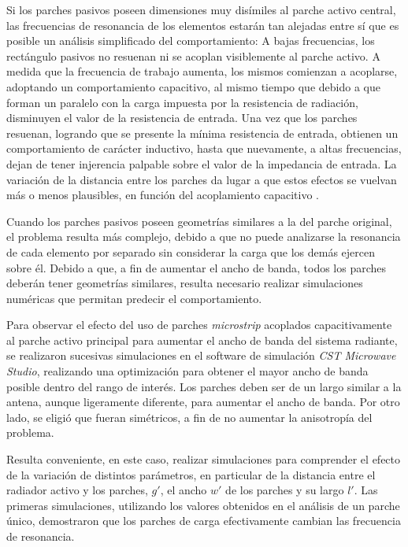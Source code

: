 Si los parches pasivos poseen dimensiones muy disímiles al parche activo central, las frecuencias de resonancia de los elementos estarán tan alejadas entre sí que es posible un análisis simplificado del comportamiento: A bajas frecuencias, los rectángulo pasivos no resuenan ni se acoplan visiblemente al parche activo. A medida que la frecuencia de trabajo aumenta, los mismos comienzan a acoplarse, adoptando un comportamiento capacitivo, al mismo tiempo que debido a que forman un paralelo con la carga impuesta por la resistencia de radiación, disminuyen el valor de la resistencia de entrada. Una vez que los parches resuenan, logrando que se presente la mínima resistencia de entrada, obtienen un comportamiento de carácter inductivo, hasta que nuevamente, a altas frecuencias, dejan de tener injerencia palpable sobre el valor de la impedancia de entrada. La variación de la distancia entre los parches da lugar a que estos efectos se vuelvan más o menos plausibles, en función del acoplamiento capacitivo \cite{Kumar:Non-radiating}.

Cuando los parches pasivos poseen geometrías similares a la del parche original, el problema resulta más complejo, debido a que no puede analizarse la resonancia de cada elemento por separado sin considerar la carga que los demás ejercen sobre él. Debido a que, a fin de aumentar el ancho de banda, todos los parches deberán tener geometrías similares, resulta necesario realizar simulaciones numéricas que permitan predecir el comportamiento.

Para observar el efecto del uso de parches \textit{microstrip} acoplados capacitivamente al parche activo principal para aumentar el ancho de banda del sistema radiante, se realizaron sucesivas simulaciones en el software de simulación \textit{CST Microwave Studio}, realizando una optimización para obtener el mayor ancho de banda posible dentro del rango de interés. Los parches deben ser de un largo similar a la antena, aunque ligeramente diferente, para aumentar el ancho de banda. Por otro lado, se eligió que fueran simétricos, a fin de no aumentar la anisotropía del problema.

Resulta conveniente, en este caso, realizar simulaciones para comprender el efecto de la variación de distintos parámetros, en particular de la distancia entre el radiador activo y los parches, $g'$, el ancho $w'$ de los parches y su largo $l'$. Las primeras simulaciones, utilizando los valores obtenidos en el análisis de un parche único, demostraron que los parches de carga efectivamente cambian las frecuencia de resonancia. 

